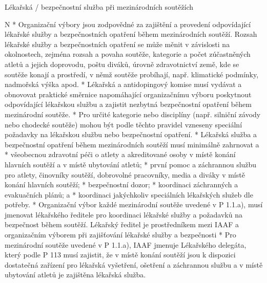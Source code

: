 \secc Lékařská / bezpečnostní služba při mezinárodních soutěžích

\begitems \style N
* Organizační výbory jsou zodpovědné za zajištění a provedení odpovídající lékařské služby a bezpečnostních opatření během mezinárodních soutěží. Rozsah lékařské služby a bezpečnostních opatření se může měnit v závislosti na okolnostech, zejména rozsah a povaha soutěže, kategorie a počet zúčastněných atletů a jejich doprovodu, poštu diváků, úrovně zdravotnictví země, kde se soutěže konají a prostředí, v němž soutěže probíhají, např. klimatické podmínky, nadmořská výška apod.
* Lékařská a antidopingový komise musí vydávat a obnovovat praktické směrnice napomáhající organizačnímu výboru poskytnout odpovídající lékařskou službu a zajistit nezbytná bezpečnostní opatření během mezinárodní soutěže.
* Pro určité kategorie nebo disciplíny (např. silniční závody nebo chodecké soutěže) mohou být podle těchto pravidel vzneseny speciální požadavky na lékařskou službu nebo bezpečnostní opatření.
* Lékařská služba a bezpečnostní opatření během mezinárodních soutěží musí minimálně zahrnovat
  \begitems \style a
  * všeobecnou zdravotní péči o atlety a akreditované osoby v místě konání hlavních soutěží a v místě ubytování atletů;
  * první pomoc a záchrannou službu pro atlety, činovníky soutěží, dobrovolné pracovníky, media a diváky v místě konání hlavních soutěží;
  * bezpečnostní dozor;
  * koordinaci záchranných a evakuačních plánů; a
  * koordinaci jakýchkoliv speciálních lékařských služeb dle potřeby.
  \enditems
* Organizační výbor každé mezinárodní soutěže uvedené v P 1.1.a), musí jmenovat lékařského ředitele pro koordinaci lékařské služby a požadavků na bezpečnost během soutěží. Lékařský ředitel je prostředníkem mezi IAAF a organizačním výborem při zajišťování lékařské služby a bezpečnosti
* Pro mezinárodní soutěže uvedené v P 1.1.a), IAAF jmenuje Lékařského delegáta, který podle P 113 musí zajistit, že v místě konání soutěží jsou k dispozici dostatečná zařízení pro lékařská vyšetření, ošetření a záchrannou službu a v místě ubytování atletů je zajištěna lékařská služba.
\enditems

\endinput